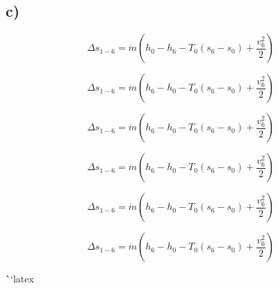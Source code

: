 

\subsection*{c)}

\[
\Delta s_{1-6} = \dot{m} \left( h_0 - h_6 - T_0 \left( s_6 - s_0 \right) + \frac{v_6^2}{2} \right)
\]

\[
\Delta s_{1-6} = \dot{m} \left( h_6 - h_0 - T_0 \left( s_6 - s_0 \right) + \frac{v_6^2}{2} \right)
\]

\[
\Delta s_{1-6} = \dot{m} \left( h_6 - h_0 - T_0 \left( s_6 - s_0 \right) + \frac{v_6^2}{2} \right)
\]

\[
\Delta s_{1-6} = \dot{m} \left( h_6 - h_0 - T_0 \left( s_6 - s_0 \right) + \frac{v_6^2}{2} \right)
\]

\[
\Delta s_{1-6} = \dot{m} \left( h_6 - h_0 - T_0 \left( s_6 - s_0 \right) + \frac{v_6^2}{2} \right)
\]

\[
\Delta s_{1-6} = \dot{m} \left( h_6 - h_0 - T_0 \left( s_6 - s_0 \right) + \frac{v_6^2}{2} \right)
\]

\```latex